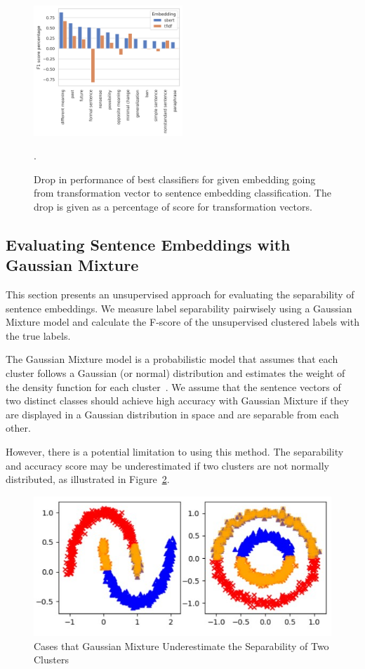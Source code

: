 \documentclass[11pt]{article}
\begin{document}
\begin{figure}[htp]
  \centering
  \includegraphics[width=0.5\textwidth]{figs/cls_gs_labels_context_diff.png}

  \caption{Drop in performance of best classifiers for given embedding going
  from transformation vector to sentence embedding classification. The drop is
  given as a percentage of score for transformation
  vectors.}\label{fig:cls_gs_labels_context_diff}.

\end{figure}

\subsection{Evaluating Sentence Embeddings with Gaussian Mixture}

This section presents an unsupervised approach for evaluating the separability
of sentence embeddings. We measure label separability pairwisely using a
Gaussian Mixture model and calculate the F-score of the unsupervised clustered
labels with the true labels.

The Gaussian Mixture model is a probabilistic model that assumes that each
cluster follows a Gaussian (or normal) distribution and estimates the weight of
the density function for each cluster~\cite{reynolds2009gaussian,5298967}. We
assume that the sentence vectors of two distinct classes should achieve high
accuracy with Gaussian Mixture if they are displayed in a Gaussian distribution
in space and are separable from each other.

However, there is a potential limitation to using this method. The separability
and accuracy score may be underestimated if two clusters are not normally
distributed, as illustrated in Figure~\ref{fig:cirle}.


\begin{figure}[htp]
    \centering
    \includegraphics[scale=0.4]{figs/Circle.jpg}
    \caption{Cases that Gaussian Mixture Underestimate the Separability of Two
    Clusters}\label{fig:cirle}
\end{figure}
\end{document}
